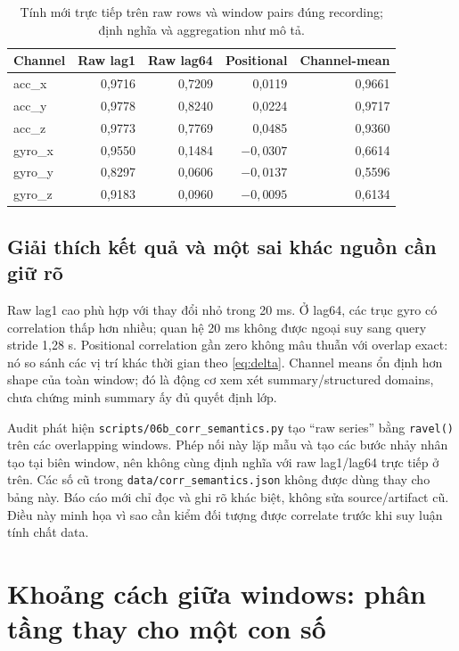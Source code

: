 \documentclass[11pt,a4paper]{article}
\newcommand{\code}[1]{{\small\ttfamily\nolinkurl{#1}}}
\theoremstyle{definition}
\begin{document}
\begin{table}[htbp]\centering\small
\begin{tabular}{@{}lrrrr@{}}\toprule
Channel & Raw lag1 & Raw lag64 & Positional & Channel-mean\\\midrule
acc\_x & 0,9716 & 0,7209 & 0,0119 & 0,9661\\
acc\_y & 0,9778 & 0,8240 & 0,0224 & 0,9717\\
acc\_z & 0,9773 & 0,7769 & 0,0485 & 0,9360\\
gyro\_x & 0,9550 & 0,1484 & $-0,0307$ & 0,6614\\
gyro\_y & 0,8297 & 0,0606 & $-0,0137$ & 0,5596\\
gyro\_z & 0,9183 & 0,0960 & $-0,0095$ & 0,6134\\\bottomrule
\end{tabular}
\caption{Tính mới trực tiếp trên raw rows và window pairs đúng recording; định nghĩa và aggregation như mô tả.}
\end{table}

\subsection{Giải thích kết quả và một sai khác nguồn cần giữ rõ}
Raw lag1 cao phù hợp với thay đổi nhỏ trong 20 ms. Ở lag64, các trục gyro
có correlation thấp hơn nhiều; quan hệ 20 ms không được ngoại suy sang
query stride 1,28 s. Positional correlation gần zero không mâu thuẫn với
overlap exact: nó so sánh các vị trí khác thời gian theo \eqref{eq:delta}.
Channel means ổn định hơn shape của toàn window; đó là động cơ xem xét
summary/structured domains, chưa chứng minh summary ấy đủ quyết định lớp.

Audit phát hiện \code{scripts/06b_corr_semantics.py} tạo ``raw series'' bằng
\code{ravel()} trên các overlapping windows. Phép nối này lặp mẫu và tạo
các bước nhảy nhân tạo tại biên window, nên không cùng định nghĩa với raw
lag1/lag64 trực tiếp ở trên. Các số cũ trong \code{data/corr_semantics.json}
không được dùng thay cho bảng này. Báo cáo mới chỉ đọc và ghi rõ khác biệt,
không sửa source/artifact cũ. Điều này minh họa vì sao cần kiểm đối tượng
được correlate trước khi suy luận tính chất data.

\section{Khoảng cách giữa windows: phân tầng thay cho một con số}
\end{document}

